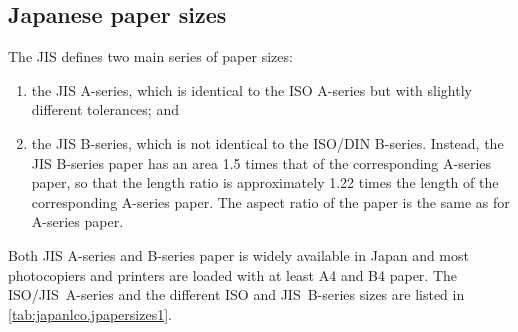 \subsection{Japanese paper sizes}

The JIS defines two main series of paper sizes:
\begin{enumerate}
\item the JIS A-series, which is identical to the ISO A-series but
  with slightly different tolerances; and
\item the JIS B-series, which is not identical to the ISO/DIN
  B-series. Instead, the JIS B-series paper has an area 1.5 times that
  of the corresponding A-series paper, so that the length ratio is
  approximately 1.22 times the length of the corresponding A-series
  paper. The aspect ratio of the paper is the same as for A-series
  paper.
\end{enumerate}

Both JIS A-series and B-series paper is widely available in Japan and most
photocopiers and printers are loaded with at least A4 and B4 paper. The
ISO/JIS~A-series and the different ISO and JIS~B-series sizes are listed in
\autoref{tab:japanlco.jpapersizes1}.

